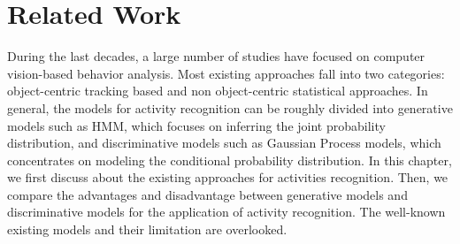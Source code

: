 \chapter{Related Work}
\label{chap:relatedwork}
During the last decades, a large number of studies have focused on computer vision-based behavior analysis. Most existing approaches fall into two categories: object-centric tracking based and non object-centric statistical approaches. 
In general, the models for activity recognition can be roughly divided into generative models such as HMM, which focuses on inferring the joint probability distribution, and discriminative models such as Gaussian Process models, which concentrates on modeling the conditional probability distribution.
In this chapter, we first discuss about the existing approaches for activities recognition. Then, we compare the advantages and disadvantage between generative models and discriminative models for the application of activity recognition. The well-known existing models and their limitation are overlooked. 
